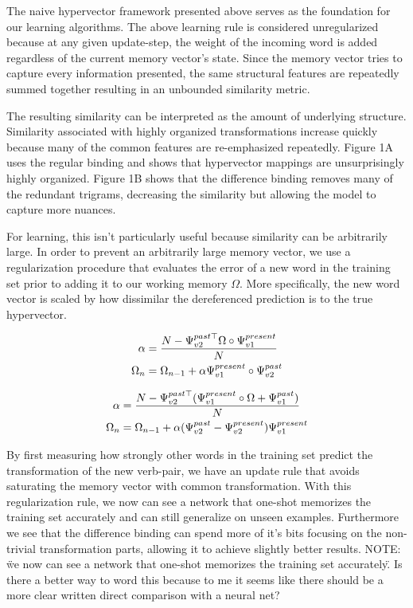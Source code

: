 \documentclass{article}
\begin{document}
The naive hypervector framework presented above serves as the foundation for our learning algorithms. The above learning rule is considered unregularized because at any given update-step, the weight of the incoming word is added regardless of the current memory vector's state. Since the memory vector tries to capture every information presented, the same structural features are repeatedly summed together resulting in an unbounded similarity metric.

The resulting similarity can be interpreted as the amount of underlying structure. Similarity associated with highly organized transformations increase quickly because many of the common features are re-emphasized repeatedly. Figure 1A  uses the regular binding and shows that hypervector mappings are unsurprisingly highly organized. Figure 1B shows that the difference binding removes many of the redundant trigrams, decreasing the similarity but allowing the model to capture more nuances.

For learning, this isn't particularly useful because similarity can be arbitrarily large. In order to prevent an arbitrarily large memory vector, we use a regularization procedure that evaluates the error of a new word in the training set prior to adding it to our working memory $\Omega$. More specifically, the new word vector is scaled by how dissimilar the dereferenced prediction is to the true hypervector.

\begin{align}
\label{eq:regularization_vec}
\notag \alpha &= \frac{N-\Psi^{past\top}_{v2} \Omega \circ \Psi^{present}_{v1}}{N}  \\
\Omega_n &= \Omega_{n-1} + \alpha \Psi^{present}_{v1} \circ \Psi^{past}_{v2}
\end{align}

\begin{align}
\label{eq:regularization_difference_vec}
\notag \alpha &= \frac{N-
\Psi^{past\top}_{v2} (\Psi^{present}_{v1} \circ \Omega+
\Psi^{past}_{v1})}{N} \\
\Omega_n &= \Omega_{n-1} + \alpha
(\Psi^{past}_{v2} - \Psi^{present}_{v2})
\Psi^{present}_{v1}
\end{align}

By first measuring how strongly other words in the training set predict the transformation of the new verb-pair, we have an update rule that avoids saturating the memory vector with common transformation. With this regularization rule, we now can see a network that one-shot memorizes the training set accurately and can still generalize on unseen examples. Furthermore we see that the difference binding can spend more of it's bits focusing on the non-trivial transformation parts, allowing it to achieve slightly better results.
NOTE: \" we now can see a network that one-shot memorizes the training set accurately\". Is there a better way to word this because to me it seems like there should be a more clear written direct comparison with a neural net?
\end{document}
